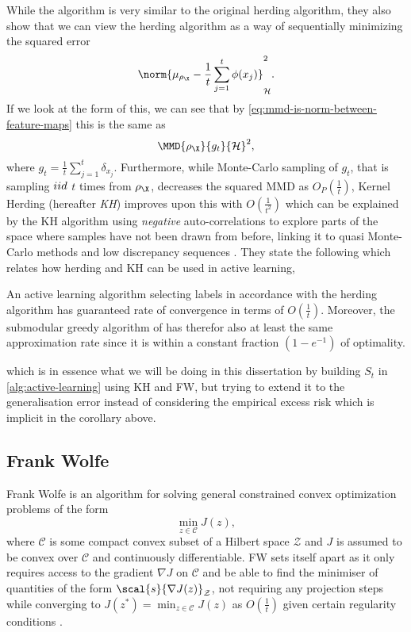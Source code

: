 While the algorithm is very similar to the original herding algorithm, they also show
that we can view the herding algorithm as a way of sequentially minimizing the
squared error
\begin{equation*}
  \label{eq:squared-error-herding}
  \norm{\mu_{\rho_{\X}} - \frac{1}{t} \sum_{j=1}^{t} \phi(x_{j})}_{\rkhs{H}}^{2}.
\end{equation*}
If we look at the form of this, we can see that by
\ref{eq:mmd-is-norm-between-feature-maps} this is the same as
\begin{equation*}
  \MMD{\rho_{\X}}{g_{t}}{\rkhs{H}}^{2},
\end{equation*} where \(g_{t} = \frac{1}{t} \sum_{j=1}^{t}
\delta_{x_{j}}\). Furthermore, while Monte-Carlo sampling of \(g_{t}\),
that is sampling \(iid\) \(t\) times from \(\rho_{\X}\), decreases the squared MMD as
\(O_P(\frac{1}{t})\), Kernel Herding (hereafter \textit{KH}) improves upon this
with \(O(\frac{1}{t^{2}})\) which can be explained by the KH algorithm using
\emph{negative} auto-correlations to explore parts of the space where samples
have not been drawn from before, linking it to quasi Monte-Carlo methods and low
discrepancy sequences \citep{chen12_super_sampl_from_kernel_herdin,bach12_equiv_between_herdin_condit_gradien_algor}.
They state the following which relates how herding and KH can be used in active
learning,
\begin{corollary} An
  active learning algorithm selecting labels in accordance with the herding
  algorithm has guaranteed rate of convergence in terms of \(O(\frac{1}{t})\).
  Moreover, the submodular greedy algorithm of
  \citep{krause08_near_optim_sensor_placem_gauss_proces} has therefor also at least
  the same approximation rate since it is within a constant fraction \((1 -
  e^{-1})\) of optimality.
\end{corollary}
which is in essence what we will be doing in this dissertation by building
\(S_t\) in \ref{alg:active-learning} using KH and FW, but trying to extend
it to the generalisation error instead of considering the empirical excess risk
which is implicit in the corollary above.

\subsection{Frank Wolfe}
Frank Wolfe \citep{frank56_algor_quadr_progr} is an algorithm for solving general
constrained convex optimization problems of the form
\begin{equation*}
\label{eq:constrainted-convex-opt-problem} \min_{z \in \mathcal{C}} J(z),
\end{equation*} where \(\mathcal{C}\) is some compact convex subset of a Hilbert
space \(\mathcal{Z}\) and \(J\) is assumed to be convex over \(\mathcal{C}\) and
continuously differentiable. FW sets itself apart as it only requires access to
the gradient \(\nabla J\) on \(\mathcal{C}\) and be able to find the minimiser
of quantities of the form \(\scal{s}{\nabla J(z)}_{\mathcal{Z}}\),  not
requiring any projection steps while converging to \(J(z^{\ast}) = \min_{z
\in \mathcal{C}} J(z)\) as \(O(\frac{1}{t})\) given certain regularity
conditions \citep{jaggi13_revis_frank_wolfe}.

